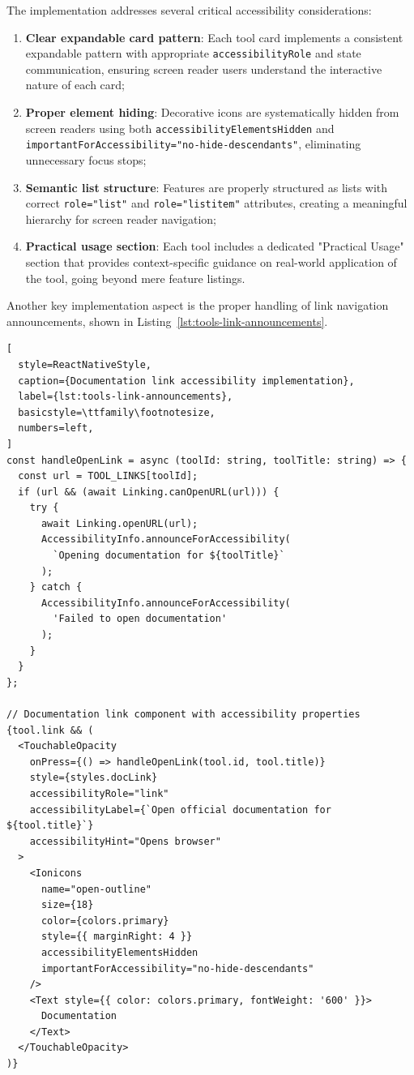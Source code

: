 The implementation addresses several critical accessibility considerations:

\begin{enumerate}
    \item \textbf{Clear expandable card pattern}: Each tool card implements a consistent expandable pattern with appropriate \texttt{accessibilityRole} and state communication, ensuring screen reader users understand the interactive nature of each card;
    
    \item \textbf{Proper element hiding}: Decorative icons are systematically hidden from screen readers using both \texttt{accessibilityElementsHidden} and \\\texttt{importantForAccessibility="no-hide-descendants"}, eliminating unnecessary focus stops;
    
    \item \textbf{Semantic list structure}: Features are properly structured as lists with correct \texttt{role="list"} and \texttt{role="listitem"} attributes, creating a meaningful hierarchy for screen reader navigation;
    
    \item \textbf{Practical usage section}: Each tool includes a dedicated "Practical Usage" section that provides context-specific guidance on real-world application of the tool, going beyond mere feature listings.
\end{enumerate}

Another key implementation aspect is the proper handling of link navigation announcements, shown in Listing~\ref{lst:tools-link-announcements}.

\begin{lstlisting}[
  style=ReactNativeStyle,
  caption={Documentation link accessibility implementation},
  label={lst:tools-link-announcements},
  basicstyle=\ttfamily\footnotesize,
  numbers=left,
]
const handleOpenLink = async (toolId: string, toolTitle: string) => {
  const url = TOOL_LINKS[toolId];
  if (url && (await Linking.canOpenURL(url))) {
    try {
      await Linking.openURL(url);
      AccessibilityInfo.announceForAccessibility(
        `Opening documentation for ${toolTitle}`
      );
    } catch {
      AccessibilityInfo.announceForAccessibility(
        'Failed to open documentation'
      );
    }
  }
};

// Documentation link component with accessibility properties
{tool.link && (
  <TouchableOpacity
    onPress={() => handleOpenLink(tool.id, tool.title)}
    style={styles.docLink}
    accessibilityRole="link"
    accessibilityLabel={`Open official documentation for ${tool.title}`}
    accessibilityHint="Opens browser"
  >
    <Ionicons 
      name="open-outline" 
      size={18} 
      color={colors.primary} 
      style={{ marginRight: 4 }} 
      accessibilityElementsHidden 
      importantForAccessibility="no-hide-descendants"
    />
    <Text style={{ color: colors.primary, fontWeight: '600' }}>
      Documentation
    </Text>
  </TouchableOpacity>
)}
\end{lstlisting}
\FloatBarrier

